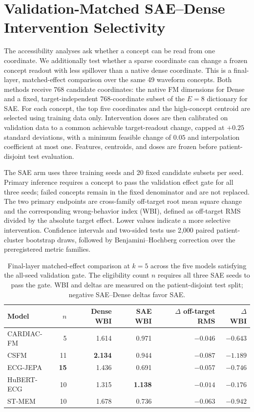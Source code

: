 \section{Validation-Matched SAE--Dense Intervention Selectivity}
\label{app:matched-effect}

The accessibility analyses ask whether a concept can be read from one coordinate. We additionally test whether a sparse coordinate can change a frozen concept readout with less spillover than a native dense coordinate. This is a final-layer, matched-effect comparison over the same 49 waveform concepts. Both methods receive 768 candidate coordinates: the native FM dimensions for Dense and a fixed, target-independent 768-coordinate subset of the $E=8$ dictionary for SAE. For each concept, the top five coordinates and the high-concept centroid are selected using training data only. Intervention doses are then calibrated on validation data to a common achievable target-readout change, capped at $+0.25$ standard deviations, with a minimum feasible change of $0.05$ and interpolation coefficient at most one. Features, centroids, and doses are frozen before patient-disjoint test evaluation.

The SAE arm uses three training seeds and 20 fixed candidate subsets per seed. Primary inference requires a concept to pass the validation effect gate for all three seeds; failed concepts remain in the fixed denominator and are not replaced. The two primary endpoints are cross-family off-target root mean square change and the corresponding wrong-behavior index (WBI), defined as off-target RMS divided by the absolute target effect. Lower values indicate a more selective intervention. Confidence intervals and two-sided tests use 2,000 paired patient-cluster bootstrap draws, followed by Benjamini--Hochberg correction over the preregistered metric families.

\begin{table}[t]
  \centering
  \caption{Final-layer matched-effect comparison at $k=5$ across the five models satisfying the all-seed validation gate. The eligibility count $n$ requires all three SAE seeds to pass the gate. WBI and deltas are measured on the patient-disjoint test split; negative SAE--Dense deltas favor SAE.}
  \label{tab:matched-effect-dense-sae}
  \begin{tabular}{lrrrrr}
    \toprule
    Model & $n$ & Dense WBI & SAE WBI & $\Delta$ off-target RMS & $\Delta$ WBI \\
    \midrule
    CARDIAC-FM & 5  & 1.614 & 0.971 & $-0.046$ & $-0.643$ \\
    CSFM       & 11 & \textbf{2.134} & 0.944 & $-0.087$ & $-1.189$ \\
    ECG-JEPA   & \textbf{15} & 1.436 & 0.691 & $-0.057$ & $-0.746$ \\
    HuBERT-ECG & 10 & 1.315 & \textbf{1.138} & $\boldsymbol{-0.014}$ & $\boldsymbol{-0.176}$ \\
    ST-MEM     & 10 & 1.678 & 0.736 & $-0.063$ & $-0.942$ \\
    \bottomrule
  \end{tabular}
\end{table}


